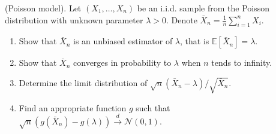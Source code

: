 
\begin{Exercise}
  (Poisson model). Let $\left(X_{1}, \ldots, X_{n}\right)$ be an i.i.d. sample from the Poisson distribution with unknown parameter $\lambda>0$. Denote $\bar{X}_{n}=\frac{1}{n} \sum_{i=1}^{n} X_{i}$.

  \begin{enumerate}
    \item Show that $\bar{X}_{n}$ is an unbiased estimator of $\lambda$, that is
          $\mathbb{E}\left[\bar{X}_{n}\right]=\lambda$.

    \item Show that $\bar{X}_{n}$ converges in probability to $\lambda$ when $n$ tends to
          infinity.

    \item Determine the limit distribution of $\sqrt{n}\left(\bar{X}_{n}-\lambda\right) /
            \sqrt{\bar{X}_{n}}$.

    \item Find an appropriate function $g$ such that
          $\sqrt{n}\left(g\left(\bar{X}_{n}\right)-g(\lambda)\right)
            \stackrel{d}{\longrightarrow} \mathcal{N}(0,1)$.

  \end{enumerate}
\end{Exercise}



